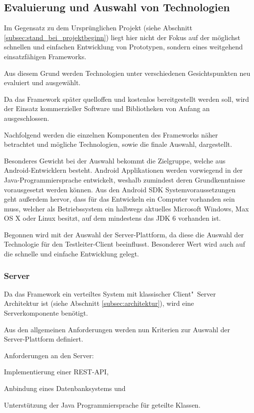 \subsection{Evaluierung und Auswahl von Technologien}
Im Gegensatz zu dem Ursprünglichen Projekt (siehe Abschnitt \ref{subsec:stand_bei_projektbeginn}) liegt hier nicht der Fokus auf der möglichst schnellen und einfachen Entwicklung von Prototypen, sondern eines weitgehend einsatzfähigen Frameworks.

Aus diesem Grund werden Technologien unter verschiedenen Gesichtspunkten neu evaluiert und ausgewählt.

Da das Framework später quelloffen und kostenlos bereitgestellt werden soll, wird der Einsatz kommerzieller Software und Bibliotheken von Anfang an ausgeschlossen.

Nachfolgend werden die einzelnen Komponenten des Frameworks näher betrachtet und mögliche Technologien, sowie die finale Auswahl, dargestellt.

Besonderes Gewicht bei der Auswahl bekommt die Zielgruppe, welche aus Android-Entwicklern besteht.
Android Applikationen werden vorwiegend in der Java-Pro\-gram\-mier\-spra\-che entwickelt, weshalb zumindest deren Grundkenntnisse vorausgesetzt werden können.
Aus den Android \ac{SDK} Systemvoraussetzungen \cite[vgl.][]{AndroidOpenSourceProject.2014c} geht außerdem hervor, dass für das Entwickeln ein Computer vorhanden sein muss, welcher als Betriebssystem ein halbwegs aktuelles Microsoft Windows, Max OS X oder Linux besitzt, auf dem mindestens das \ac{JDK} 6 vorhanden ist.

Begonnen wird mit der Auswahl der Server-Plattform, da diese die Auswahl der Technologie für den Testleiter-Client beeinflusst.
Besonderer Wert wird auch auf die schnelle und einfache Entwicklung gelegt.

\subsubsection{Server}
Da das Framework ein verteiltes System mit klassischer Client"~Server Architektur ist (siehe Abschnitt \ref{subsec:architektur}), wird eine Serverkomponente benötigt.

Aus den allgemeinen Anforderungen werden nun Kriterien zur Auswahl der Server-Plattform definiert.

Anforderungen an den Server:
\begin{compactitem}
	\item Implementierung einer \ac{REST}-\ac{API},
	\item Anbindung eines Datenbanksystems und
	\item Unterstützung der Java Programmiersprache für geteilte Klassen.
\end{compactitem}

